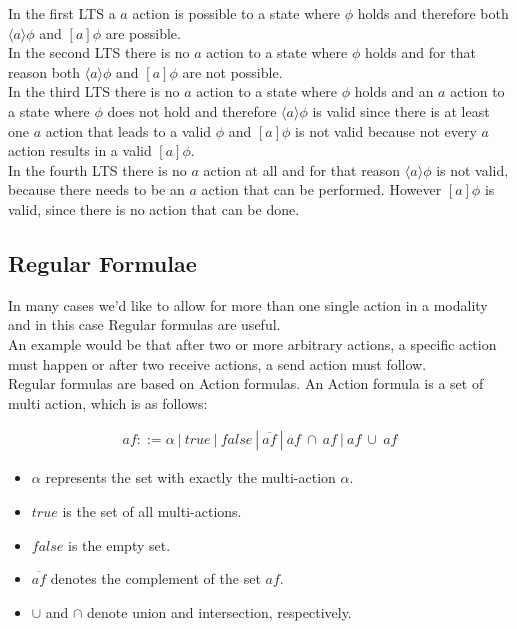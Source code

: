 \documentclass{clseminar}
\begin{document}
  In the first LTS a $a$ action is possible to a state where $\phi$ holds and therefore both $\langle{}a\rangle{}\phi$ and $[a]\phi$ are possible. \\
  In the second LTS there is no $a$ action to a state where $\phi$ holds and for that reason both $\langle{}a\rangle{}\phi$ and $[a]\phi$ are not possible. \\
  In the third LTS there is no $a$ action to a state where $\phi$ holds and an $a$ action to a state where $\phi$ does not hold and therefore $\langle{}a\rangle{}\phi$ is valid since there is at least one $a$ action that leads to a valid $\phi$ and $[a]\phi$ is not valid because not every $a$ action results in a valid $[a]\phi$. \\
  In the fourth LTS there is no $a$ action at all and for that reason $\langle{}a\rangle{}\phi$ is not valid, because there needs to be an $a$ action that can be performed. However $[a]\phi$ is valid, since there is no action that can be done.

  \subsection{Regular Formulae}

  In many cases we'd like to allow for more than one single action in a modality and in this case Regular formulas are useful. \\
  An example would be that after two or more arbitrary actions, a specific action must happen or after two receive actions, a send action must follow. \\
  Regular formulas are based on Action formulas. An Action formula is a set of multi action, which is as follows:

  \pagebreak
  \begin{align*}
    \mathit{af} ::= \alpha\ |\ \mathit{true}\ |\ \mathit{false}\ |\ \overline{\mathit{af}}\ |\ \mathit{af}\ \cap\ \mathit{af}\ |\ \mathit{af}\ \cup\ \mathit{af}
  \end{align*}

  \begin{itemize}
    \item $\alpha$ represents the set with exactly the multi-action $\alpha$.
    \item $\mathit{true}$ is the set of all multi-actions.
    \item $\mathit{false}$ is the empty set.
    \item $\overline{\mathit{af}}$ denotes the complement of the set $\mathit{af}$.
    \item $\cup$ and $\cap$ denote union and intersection, respectively.
  \end{itemize}
\end{document}
